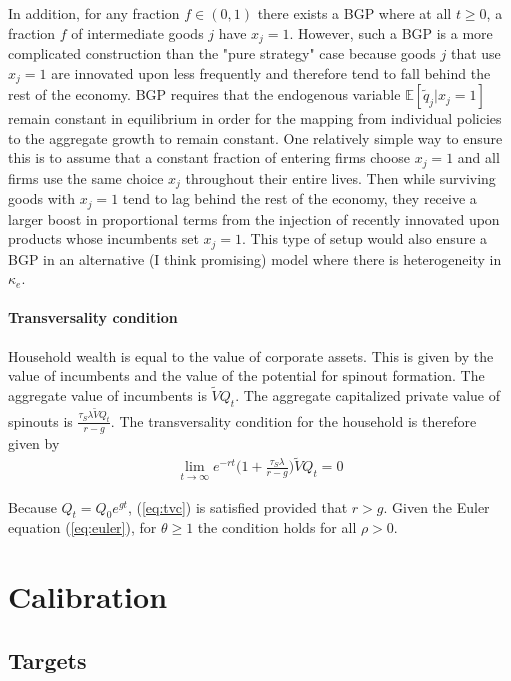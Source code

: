 \documentclass[11pt,english]{article}
\theoremstyle{remark}
\begin{document}
In addition, for any fraction $f \in (0,1)$ there exists a BGP where at all $t \ge 0$, a fraction $f$ of intermediate goods $j$ have $x_j = 1$. However, such a BGP is a more complicated construction than the "pure strategy" case because goods $j$ that use $x_j = 1$ are innovated upon less frequently and therefore tend to fall behind the rest of the economy. BGP requires that the endogenous variable $\mathbb{E}[\tilde{q}_j | x_j = 1]$ remain constant in equilibrium in order for the mapping from individual policies to the aggregate growth to remain constant. One relatively simple way to ensure this is to assume that a constant fraction of entering firms choose $x_j = 1$ and all firms use the same choice $x_j$ throughout their entire lives. Then while surviving goods with $x_j = 1$ tend to lag behind the rest of the economy, they receive a larger boost in proportional terms from the injection of recently innovated upon products whose incumbents set $x_j = 1$. This type of setup would also ensure a BGP in an alternative (I think promising) model where there is heterogeneity in $\kappa_e$. 

\paragraph{Transversality condition}

Household wealth is equal to the value of corporate assets. This is given by the value of incumbents and the value of the potential for spinout formation. The aggregate value of incumbents is $\tilde{V}Q_t$. The aggregate capitalized private value of spinouts is $\frac{\tau_S \lambda \tilde{V} Q_t}{r-g}$. The transversality condition for the household is therefore given by 
\begin{align}
	\lim_{t \to \infty} e^{-rt} \big(1 + \frac{\tau_S \lambda }{r-g}\big)\tilde{V} Q_t = 0 \label{eq:tvc}
\end{align}

Because $Q_t = Q_0 e^{gt}$, (\ref{eq:tvc}) is satisfied provided that $r > g$. Given the Euler equation (\ref{eq:euler}), for $\theta \ge 1$ the condition holds for all $\rho > 0$.  

\section{Calibration}

\subsection{Targets}
\end{document}
